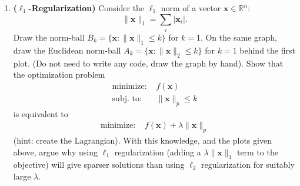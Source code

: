 \documentclass[letter,11pt]{article}
\newenvironment{solution}{
    \vspace{0.16in} {\bf Solution:}
    
}{
	\vspace{0.16in}
}
\newcommand{\xx}{\bm{x}}
\newcommand{\RR}{\mathbb{R}}
\begin{document}
\begin{enumerate}
\begin{enumerate}
        \item If $k=d$ there is no truncation, so $J_d=0$. Use this to show that the error from only using $k<d$ terms is given by \[J_k = \sum_{j=k+1}^d \lambda_j.\] Hint: partition the sum $\sum_{j=1}^d \lambda_j$ into $\sum_{j=1}^k \lambda_j$ and $\sum_{j=k+1}^d \lambda_j$.

        \begin{solution}
            \begin{align*}
                J_k &= \frac1n \sum_{i=1}^n \xx_i^T \xx_i - \sum_{j=1}^k \lambda_j \\
                &= \frac1n \sum_{i=1}^n \xx_i^T \xx_i - \sum_{j=1}^d \lambda_j + \sum_{j=k+1}^d \lambda_j
                \intertext{Since $J_d$ = 0,}
                0 &= \frac1n \sum_{i=1}^n \xx_i^T \xx_i - \sum_{i=1}^d \lambda_j
                \intertext{Thus,}
                J_k &= \sum_{j=k+1}^d \lambda_j
            \end{align*}
        \end{solution}
    \end{enumerate}

    \newpage


    \item \textbf{($\ell_1$-Regularization)} Consider the $\ell_1$ norm of a vector $\xx\in\RR^n$: \[\|\xx\|_1 = \sum_i |\xx_i|.\] Draw the norm-ball $B_k = \{\xx : \|\xx\|_1 \leq k\}$ for $k=1$. On the same graph, draw the Euclidean norm-ball $A_k = \{\xx : \|\xx\|_2 \leq k\}$ for $k=1$ behind the first plot. (Do not need to write any code, draw the graph by hand). Show that the optimization problem
    \begin{align*}
        \text{minimize: } & f(\xx)\\
        \text{subj. to: } & \|\xx\|_p \leq k
    \end{align*}
    is equivalent to
    \begin{align*}
        \text{minimize: } & f(\xx) + \lambda\|\xx\|_p
    \end{align*}
    (hint: create the Lagrangian). With this knowledge, and the plots given above, argue why using $\ell_1$ regularization (adding a $\lambda\|\xx\|_1$ term to the objective) will give sparser solutions than using $\ell_2$ regularization for suitably large $\lambda$.


\end{enumerate}
\end{document}
